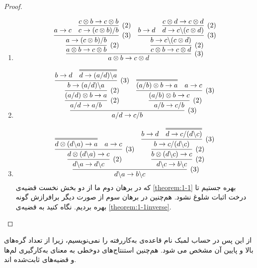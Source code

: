 \begin{proof}
\begin{enumerate}
\item
$$
\infer[(3)]{a \otimes b \rightarrow c \otimes d}{
    \infer[(2)]{a \otimes b \rightarrow c \otimes b}{
        \infer[(3)]{a \rightarrow (c \otimes b) / b}{
            a \rightarrow c
            &
            \infer[(2)]{c \rightarrow (c \otimes b) / b}{c \otimes b \rightarrow c \otimes b}
        }
    }
    &
    \infer[(2)]{c \otimes b \rightarrow c \otimes d}{
        \infer[(3)]{b \rightarrow c \backslash (c \otimes d)}{
            b \rightarrow d
            &
            \infer[(2)]{d \rightarrow c \backslash (c \otimes d)}{c \otimes d \rightarrow c \otimes d}
        }
    }
}
$$
\item
$$
\infer[(3)]{a / d \rightarrow c / b}{
    \infer[(2)]{a / d \rightarrow a / b}{
        \infer[(2)]{(a / d) \otimes b \rightarrow a}{
            \infer[(3)]{b \rightarrow (a / d) \backslash a}{
                b \rightarrow d
                &
                \infer={d \rightarrow (a / d) \backslash a}{}
            }
        }
    }
    &
    \infer[(2)]{a / b \rightarrow c / b}{
        \infer[(3)]{(a / b) \otimes b \rightarrow c}{
            \infer={(a / b) \otimes b \rightarrow a}{}
            &
            a \rightarrow c
        }
    }
}
$$
\item
$$
\infer[(3)]{d \backslash a \rightarrow b \backslash c}{
    \infer[(2)]{d \backslash a \rightarrow d \backslash c}{
        \infer[(3)]{d \otimes (d \backslash a) \rightarrow c}{
            \infer={d \otimes (d \backslash a) \rightarrow a}{}
            &
            a \rightarrow c
        }
    }
	&
	\infer[(2)]{d \backslash c \rightarrow b \backslash c}{
        \infer[(2)]{b \otimes (d \backslash c) \rightarrow c}{
            \infer[(3)]{b \rightarrow c / (d \backslash c)}{
                b \rightarrow d
                &
                \infer={d \rightarrow c / (d \backslash c)}{}
            }
        }
    }
}
$$
که در برهان دوم ما از دو بخش نخست قضیه‌ی
\ref{theorem:1-1}
بهره جستیم تا درخت اثبات شلوغ نشود.
هم‌چنین در برهان سوم از صورت دیگر برافرازش گونه بهره بردیم. نگاه کنید به قضیه‌ی
\ref{theorem:1-1inverse}.
\end{enumerate}
\end{proof}

\begin{contract}
از این پس در حساب لمبک نام قاعده‌ی به‌کار‌رفته را نمی‌نویسیم، زیرا از تعداد گره‌های بالا و پایین آن مشخص می ‌شود.
هم‌چنین استنتاج‌های دوخطی به معنای به‌کارگیری لم‌ها و قضیه‌های ثابت‌شده اند.
\end{contract}


